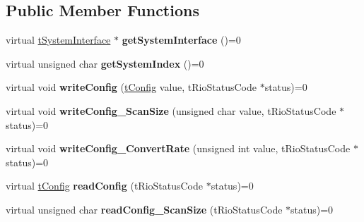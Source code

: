 \subsection*{Public Member Functions}
\begin{DoxyCompactItemize}
\item 
\hypertarget{classnFPGA_1_1nFRC__2012__1__6__4_1_1tAI_a76d1f09154c32a286efb9b761e9c6c1f}{
virtual \hyperlink{classnFPGA_1_1tSystemInterface}{tSystemInterface} $\ast$ {\bfseries getSystemInterface} ()=0}
\label{classnFPGA_1_1nFRC__2012__1__6__4_1_1tAI_a76d1f09154c32a286efb9b761e9c6c1f}

\item 
\hypertarget{classnFPGA_1_1nFRC__2012__1__6__4_1_1tAI_acd910b94bb83f7946c18b4b094653348}{
virtual unsigned char {\bfseries getSystemIndex} ()=0}
\label{classnFPGA_1_1nFRC__2012__1__6__4_1_1tAI_acd910b94bb83f7946c18b4b094653348}

\item 
\hypertarget{classnFPGA_1_1nFRC__2012__1__6__4_1_1tAI_a01815576f3e7ca500025a5982db04bcd}{
virtual void {\bfseries writeConfig} (\hyperlink{unionnFPGA_1_1nFRC__2012__1__6__4_1_1tAI_1_1tConfig}{tConfig} value, tRioStatusCode $\ast$status)=0}
\label{classnFPGA_1_1nFRC__2012__1__6__4_1_1tAI_a01815576f3e7ca500025a5982db04bcd}

\item 
\hypertarget{classnFPGA_1_1nFRC__2012__1__6__4_1_1tAI_a4e68cc06e076c9d27cc611507b61291e}{
virtual void {\bfseries writeConfig\_\-ScanSize} (unsigned char value, tRioStatusCode $\ast$status)=0}
\label{classnFPGA_1_1nFRC__2012__1__6__4_1_1tAI_a4e68cc06e076c9d27cc611507b61291e}

\item 
\hypertarget{classnFPGA_1_1nFRC__2012__1__6__4_1_1tAI_ab3e453bdecba7951f5f599f9a0049fb7}{
virtual void {\bfseries writeConfig\_\-ConvertRate} (unsigned int value, tRioStatusCode $\ast$status)=0}
\label{classnFPGA_1_1nFRC__2012__1__6__4_1_1tAI_ab3e453bdecba7951f5f599f9a0049fb7}

\item 
\hypertarget{classnFPGA_1_1nFRC__2012__1__6__4_1_1tAI_a177669c9660beee26adf4d3fc1bc0f49}{
virtual \hyperlink{unionnFPGA_1_1nFRC__2012__1__6__4_1_1tAI_1_1tConfig}{tConfig} {\bfseries readConfig} (tRioStatusCode $\ast$status)=0}
\label{classnFPGA_1_1nFRC__2012__1__6__4_1_1tAI_a177669c9660beee26adf4d3fc1bc0f49}

\item 
\hypertarget{classnFPGA_1_1nFRC__2012__1__6__4_1_1tAI_a8389244e11e33f3afc54c7ff5f278126}{
virtual unsigned char {\bfseries readConfig\_\-ScanSize} (tRioStatusCode $\ast$status)=0}
\label{classnFPGA_1_1nFRC__2012__1__6__4_1_1tAI_a8389244e11e33f3afc54c7ff5f278126}


\end{DoxyCompactItemize}
